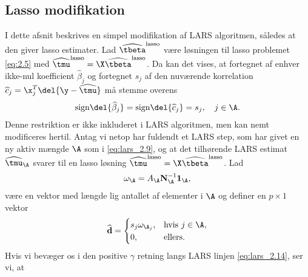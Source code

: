 \subsection{Lasso modifikation} \label{subsec:lasso_modifikation}
I dette afsnit beskrives en simpel modifikation af LARS algoritmen, således at den giver lasso estimater.
Lad \(\widehat{\tbeta}^\text{lasso}\) være løsningen til lasso problemet \eqref{eq:2.5} med \(\widehat{\tmu}^\text{lasso} = \X \widehat{\tbeta}^\text{lasso}\).
Da kan det vises, at fortegnet af enhver ikke-nul koefficient \(\widehat{\beta}_j\) og fortegnet \(s_j\) af den nuværende korrelation \(\widehat{c}_j = \x_j^T \del{\y - \widehat{\tmu}}\) må stemme overens
\begin{align}
\text{sign} \del{\widehat{\beta}_j } = \text{sign} \del{\widehat{c}_j } = s_j, \quad j \in \A. \label{eq:lars_3.1}
\end{align}
%
%
Denne restriktion er ikke inkluderet i LARS algoritmen, men kan nemt modificeres hertil. 
Antag vi netop har fuldendt et LARS step, som har givet en ny aktiv mængde \(\A\) som i \eqref{eq:lars_2.9}, og at det tilhørende LARS estimat \(\widehat{\tmu}_\A\) svarer til en lasso løsning \(\widehat{\tmu}^\text{lasso} = \X \widehat{\tbeta}^\text{lasso}\).
Lad
\begin{align*}
\omega_\A = A_\A \mathbf{N}_\A^{-1} \mathbf{1}_\A,
\end{align*}
være en vektor med længde lig antallet af elementer i \(\A\) og definer en \(p \times 1\) vektor
\begin{align*}
\widehat{\mathbf{d}} = \begin{cases}
s_j \omega_{\A_j}, &\text{hvis } j \in \A, \\
0, & \text{ellers}.
\end{cases}
\end{align*}
Hvis vi bevæger os i den positive \(\gamma\) retning langs LARS linjen \eqref{eq:lars_2.14}, ser vi, at
